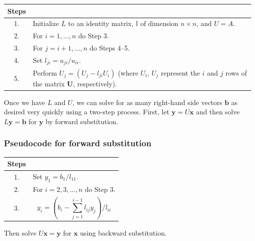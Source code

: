 \documentclass[../main.tex]{subfiles}
\begin{document}
\begin{table}[!htbp]
    \centering
    \renewcommand{\arraystretch}{1.4}
    \begin{tabular}{|c|p{}|}
        \hline
        \textbf{Steps} & \\ \hline
        1. & Initialize $L$ to an identity matrix, $\mathbb{I}$ of dimension $n\times n$, and $U=A$. \\ \hline
        2. & For $i=1,\ldots,n$ do Step 3. \\ \hline
        3. & \hspace{1.5em}For $j=i+1,\ldots,n$ do Steps 4--5. \\ \hline
        4. & \hspace{3em}Set $l_{ji}=u_{ji}/u_{ii}$. \\ \hline
        5. & \hspace{3em}Perform $U_j=(U_j-l_{ji}U_i)$ (where $U_i$, $U_j$ represent the $i$ and $j$ rows of the matrix $\mathbf{U}$, respectively). \\ \hline
    \end{tabular}
\end{table}

Once we have $L$ and $U$, we can solve for as many right-hand side vectors $\mathbf{b}$ as desired very quickly using a two-step process. First, let $\mathbf{y}=U\mathbf{x}$ and then solve $L\mathbf{y}=\mathbf{b}$ for $\mathbf{y}$ by forward substitution.
\subsubsection*{Pseudocode for forward substitution}
\begin{table}[!htbp]
    \centering
    \renewcommand{\arraystretch}{1.5}
    \begin{tabular}{|c|p{}|}
    \hline
    \textbf{Steps} & \\ \hline
    1. & Set $y_1=b_1/l_{11}$. \\ \hline
    2. & For $i=2,3,\ldots,n$ do Step 3. \\ \hline
    3. & \[
    y_i=\left(b_i-\sum_{j=1}^{i-1} l_{ij}y_j\right)\big/l_{ii}
    \] \\ \hline
    \end{tabular}
\end{table}
Then solve $U\mathbf{x}=\mathbf{y}$ for $\mathbf{x}$ using backward substitution.
\end{document}
